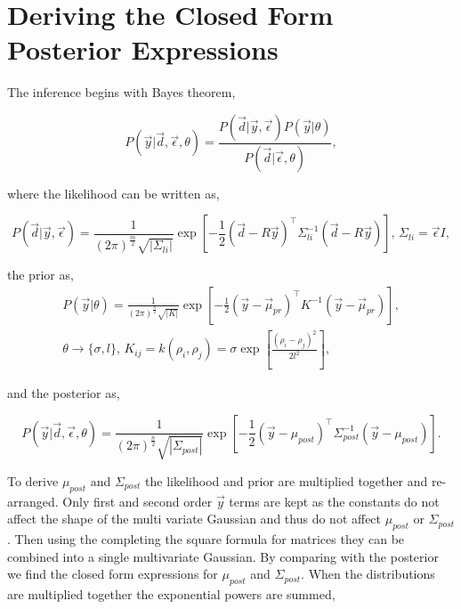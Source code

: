 \chapter{Deriving the Closed Form Posterior Expressions}
\label{append:dervcf}
The inference begins with Bayes theorem,  

\begin{equation}    
    P(\vec{y}|\vec{d}, \vec\epsilon, \theta) = \frac{P(\vec{d}|\vec{y},\vec\epsilon)P(\vec{y}|\theta)}{P(\vec d|\vec\epsilon,\theta)},
\end{equation}

where the likelihood can be written as,

\begin{equation}
P(\vec{d}|\vec{y},\vec\epsilon) = \frac{1}{(2\pi)^{\frac{m}{2}} \sqrt{|\Sigma_{li}|}} \exp \left[ -\frac{1}{2} (\vec d - R\vec y)^{\top} \Sigma^{-1}_{li} (\vec d - R\vec y) \right], \, \Sigma_{li} = \vec \epsilon I,
\end{equation}

the prior as,
\begin{equation}
\begin{split}
P(\vec y|\theta) = \frac{1}{(2\pi)^{\frac{n}{2}} \sqrt{|K|}} \exp \left[ -\frac{1}{2}(\vec y - \vec \mu_{pr})^{\top} K^{-1} (\vec y - \vec \mu_{pr}) \right],\\
\theta \rightarrow \{\sigma, l\}, \, K_{ij} = k(\rho_i, \rho_j) = \sigma \exp \left[\frac{(\rho_i - \rho_j)^2}{2l^2}\right],
\end{split}
\end{equation}

and the posterior as,

\begin{equation}
P(\vec{y}|\vec{d},\vec\epsilon, \theta) = \frac{1}{(2\pi)^{\frac{n}{2}} \sqrt{|\Sigma_{post}|}} \exp \left[ -\frac{1}{2}(\vec y - \mu_{post})^{\top} \Sigma^{-1}_{post} (\vec y - \mu_{post}) \right].
\end{equation}

To derive $\mu_{post}$ and $\Sigma_{post}$ the likelihood and prior are multiplied together and re-arranged. Only first and second order $\vec y$ terms are kept as the constants do not affect the shape of the multi variate Gaussian and thus do not affect $\mu_{post}$ or $\Sigma_{post}$. Then using the completing the square formula for matrices they can be combined into a single multivariate Gaussian. By comparing with the posterior we find the closed form expressions for $\mu_{post}$ and $\Sigma_{post}$. When the distributions are multiplied together the exponential powers are summed,

